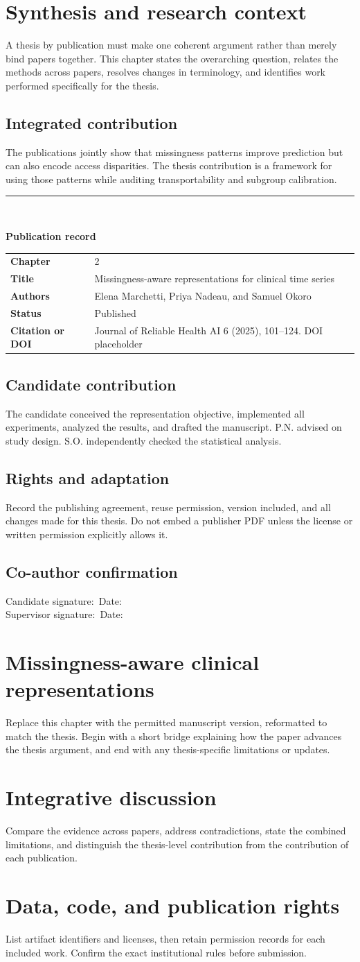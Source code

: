 \documentclass[11pt,oneside]{book}
\makeatletter
\newcommand{\publicationrecord}[6]{%
  \clearpage
  \thispagestyle{plain}
  {\color{accent}\rule{\textwidth}{1.2pt}}\\[1em]
  {\LARGE\bfseries Publication record\par}
  \vspace{1em}
  \begin{tabularx}{\textwidth}{@{}lX@{}}
  \toprule
  \textbf{Chapter} & #1 \\
  \textbf{Title} & #2 \\
  \textbf{Authors} & #3 \\
  \textbf{Status} & #4 \\
  \textbf{Citation or DOI} & #5 \\
  \bottomrule
  \end{tabularx}
  \vspace{1em}
  \section*{Candidate contribution}
  #6
  \section*{Rights and adaptation}
  Record the publishing agreement, reuse permission, version included, and all
  changes made for this thesis. Do not embed a publisher PDF unless the license
  or written permission explicitly allows it.
  \section*{Co-author confirmation}
  Candidate signature:\ \hrulefill\quad Date:\ \hrulefill\\[1.5em]
  Supervisor signature:\ \hrulefill\quad Date:\ \hrulefill
  \clearpage
}
\makeatother
\begin{document}
\tableofcontents

\mainmatter
\chapter{Synthesis and research context}
A thesis by publication must make one coherent argument rather than merely bind
papers together. This chapter states the overarching question, relates the
methods across papers, resolves changes in terminology, and identifies work
performed specifically for the thesis.

\section{Integrated contribution}
The publications jointly show that missingness patterns improve prediction but
can also encode access disparities. The thesis contribution is a framework for
using those patterns while auditing transportability and subgroup calibration.

\publicationrecord
  {2}
  {Missingness-aware representations for clinical time series}
  {Elena Marchetti, Priya Nadeau, and Samuel Okoro}
  {Published}
  {Journal of Reliable Health AI 6 (2025), 101--124. DOI placeholder}
  {The candidate conceived the representation objective, implemented all
  experiments, analyzed the results, and drafted the manuscript. P.N. advised
  on study design. S.O. independently checked the statistical analysis.}

\chapter{Missingness-aware clinical representations}
Replace this chapter with the permitted manuscript version, reformatted to
match the thesis. Begin with a short bridge explaining how the paper advances
the thesis argument, and end with any thesis-specific limitations or updates.

\chapter{Integrative discussion}
Compare the evidence across papers, address contradictions, state the combined
limitations, and distinguish the thesis-level contribution from the
contribution of each publication.

\backmatter
\chapter*{Data, code, and publication rights}
List artifact identifiers and licenses, then retain permission records for each
included work. Confirm the exact institutional rules before submission.
\end{document}
